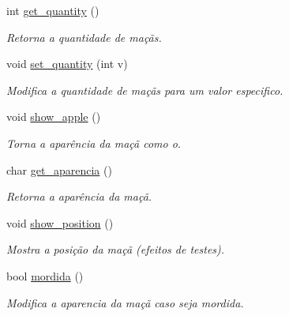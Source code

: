 \begin{DoxyCompactItemize}
int \hyperlink{classApple_afc60cf395df30061e4776f56dcc7d24f}{get\+\_\+quantity} ()
\begin{DoxyCompactList}\small\item\em Retorna a quantidade de maçãs. \end{DoxyCompactList}\item 
void \hyperlink{classApple_a4eeb2c0579e05d7dd4adfd6677a50a04}{set\+\_\+quantity} (int v)
\begin{DoxyCompactList}\small\item\em Modifica a quantidade de maçãs para um valor especifico. \end{DoxyCompactList}\item 
void \hyperlink{classApple_a4a22b5b09f493a64a1276b88513ea526}{show\+\_\+apple} ()
\begin{DoxyCompactList}\small\item\em Torna a aparência da maçã como o. \end{DoxyCompactList}\item 
char \hyperlink{classApple_a4b4decead81e29c16a9dd4c7a3e70107}{get\+\_\+aparencia} ()
\begin{DoxyCompactList}\small\item\em Retorna a aparência da maçã. \end{DoxyCompactList}\item 
void \hyperlink{classApple_af9794341f658031e4e98e5c25c796a34}{show\+\_\+position} ()
\begin{DoxyCompactList}\small\item\em Mostra a posição da maçã (efeitos de testes). \end{DoxyCompactList}\item 
bool \hyperlink{classApple_a26996683f71826895b059105e63a9dfe}{mordida} ()
\begin{DoxyCompactList}\small\item\em Modifica a aparencia da maçã caso seja mordida. \end{DoxyCompactList}\end{DoxyCompactItemize}
